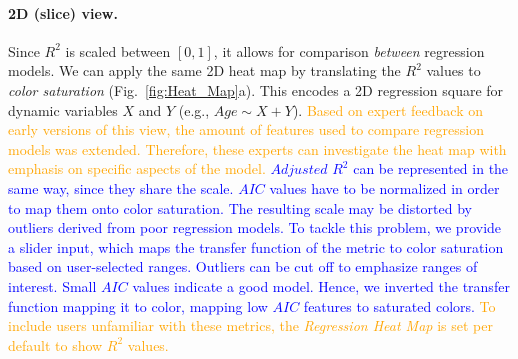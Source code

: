 \documentclass[journal]{style/vgtc} 			          %
\newcommand{\add}[1]{\textcolor{blue}{#1}}
\newcommand{\design}[1]{\textcolor{orange}{#1}}
\begin{document}
\paragraph{2D (slice) view.}
Since $R^2$ is scaled between $[0, 1]$, it allows for comparison \emph{between} regression models.
We can apply the same 2D heat map by translating the $R^2$ values to \emph{color saturation} (Fig.~\ref{fig:Heat_Map}a).
This encodes a 2D regression square for dynamic variables $X$ and $Y$ (e.g., $Age \sim X + Y$).
\design{
Based on expert feedback on early versions of this view, the amount of features used to compare regression models was extended.
Therefore, these experts can investigate the heat map with emphasis on specific aspects of the model.
}
\add{
$Adjusted$ $R^2$ can be represented in the same way, since they share the scale.
$AIC$ values have to be normalized in order to map them onto color saturation.
The resulting scale may be distorted by outliers derived from poor regression models.
To tackle this problem, we provide a slider input, which maps the transfer function of the metric to color saturation based on user-selected ranges.
Outliers can be cut off to emphasize ranges of interest.
Small $AIC$ values indicate a good model.
Hence, we inverted the transfer function mapping it to color, mapping low $AIC$ features to saturated colors.
}
\design{
To include users unfamiliar with these metrics, the \emph{Regression Heat Map} is set per default to show $R^2$ values.
}
\end{document}
